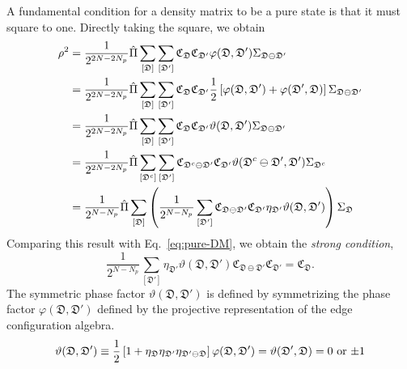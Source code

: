 A fundamental condition for a density matrix to be a pure state is that it must square to one. Directly taking the square, we obtain 
\begin{align*}
    \rho^2 
    &= 
    \frac{1}{2^{2N-2N_p}}
    \hat{\Pi}
    \sum_{[\mathfrak{D}]}\sum_{[\mathfrak{D}']}
    \mathfrak{C}_{\mathfrak{D}}
    \mathfrak{C}_{\mathfrak{D}'}
    \varphi(\mathfrak{D},\mathfrak{D}')
    \Sigma_{\mathfrak{D}\ominus\mathfrak{D}'}\\
    &=
    \frac{1}{2^{2N-2N_p}}
    \hat{\Pi}
    \sum_{[\mathfrak{D}]}\sum_{[\mathfrak{D}']}
    \mathfrak{C}_{\mathfrak{D}}
    \mathfrak{C}_{\mathfrak{D}'}
    \frac{1}{2}
    \left[ 
    \varphi(\mathfrak{D},\mathfrak{D}')
    +
    \varphi(\mathfrak{D}',\mathfrak{D})
     \right]
    \Sigma_{\mathfrak{D}\ominus\mathfrak{D}'} \\
    &=
    \frac{1}{2^{2N-2N_p}}
    \hat{\Pi}
    \sum_{[\mathfrak{D}]}\sum_{[\mathfrak{D}']}
    \mathfrak{C}_{\mathfrak{D}}
    \mathfrak{C}_{\mathfrak{D}'}
    \vartheta(\mathfrak{D},\mathfrak{D}')
    \Sigma_{\mathfrak{D}\ominus\mathfrak{D}'} \\
    &= 
    \frac{1}{2^{2N-2N_p}}
    \hat{\Pi}
    \sum_{[\mathfrak{D}^c]}\sum_{[\mathfrak{D}']}
    \mathfrak{C}_{\mathfrak{D}^c\ominus\mathfrak{D}'}
    \mathfrak{C}_{\mathfrak{D}'}
    \vartheta(\mathfrak{D}^c\ominus\mathfrak{D}',\mathfrak{D}')
    \Sigma_{\mathfrak{D}^c} \\
    &=
    \frac{1}{2^{N-N_p}}
    \hat{\Pi}
    \sum_{[\mathfrak{D}]}
    \left( 
        \frac{1}{2^{N-N_p}}
        \sum_{[\mathfrak{D}']}
        \mathfrak{C}_{\mathfrak{D}\ominus\mathfrak{D}'}
        \mathfrak{C}_{\mathfrak{D}'}
        \eta_{\mathfrak{D}'}
        \vartheta(\mathfrak{D},\mathfrak{D}')
     \right)
    \Sigma_{\mathfrak{D}}
\end{align*}
Comparing this result with Eq.~\eqref{eq:pure-DM}, we obtain the \textit{strong condition},
\begin{equation}\label{eq:strong-condition}
    \frac{1}{2^{N-N_p}}
    \sum_{[\mathfrak{D}']}
    \eta_{\mathfrak{D}'} \vartheta(\mathfrak{D},\mathfrak{D}')
    \mathfrak{C}_{\mathfrak{D}\ominus\mathfrak{D}'}
    \mathfrak{C}_{\mathfrak{D}'}
    =
    \mathfrak{C}_{\mathfrak{D}}.
\end{equation}
The symmetric phase factor $\vartheta(\mathfrak{D},\mathfrak{D}')$ is defined by symmetrizing the phase factor $\varphi(\mathfrak{D},\mathfrak{D}')$ defined by the projective representation of the edge configuration algebra.
\[
    \vartheta(\mathfrak{D},\mathfrak{D}') 
    \equiv 
    \frac{1}{2}
    \left[ 
    1
    +
    \eta_{\mathfrak{D}}
    \eta_{\mathfrak{D}'}
    \eta_{\mathfrak{D}'\ominus\mathfrak{D}}
     \right]\varphi(\mathfrak{D},\mathfrak{D}')
    =
    \vartheta(\mathfrak{D}',\mathfrak{D})
    =
    \text{$0$ or $\pm 1$}
\]
